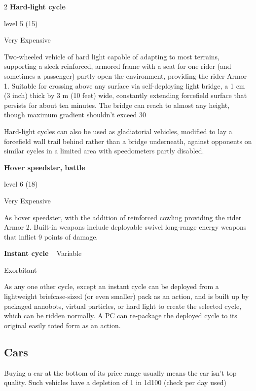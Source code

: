\begin{multicols}{2}
\textbf{Hard-light cycle}

level 5 (15) 

Very Expensive 

Two-wheeled vehicle of hard light capable of adapting to most terrains, supporting a sleek reinforced, armored frame with a seat for one rider (and sometimes a passenger) partly open the environment, providing the rider Armor 1. Suitable for crossing above any surface via self-deploying light bridge, a 1 cm (3 inch) thick by 3 m (10 feet) wide, constantly extending forcefield surface that persists for about ten minutes. The bridge can reach to almost any height, though maximum gradient shouldn’t exceed 30%

Hard-light cycles can also be used as gladiatorial vehicles, modified to lay a forcefield wall trail behind rather than a bridge underneath, against opponents on similar cycles in a limited area with speedometers partly disabled.

\textbf{Hover speedster, battle}

level 6 (18) 

Very Expensive

As hover speedster, with the addition of reinforced cowling providing the rider Armor 2. Built-in weapons include deployable swivel long-range energy weapons that inflict 9 points of damage.

\textbf{Instant cycle}
 
Variable 

Exorbitant 

As any one other cycle, except an instant cycle can be deployed from a lightweight briefcase-sized (or even smaller) pack as an action, and is built up by packaged nanobots, virtual particles, or hard light to create the selected cycle, which can be ridden normally. A PC can re-package the deployed cycle to its original easily toted form as an action.

\subsection{Cars}

Buying a car at the bottom of its price range usually means the car isn’t top quality. Such vehicles have a depletion of 1 in 1d100 (check per day used)

\end{multicols}

